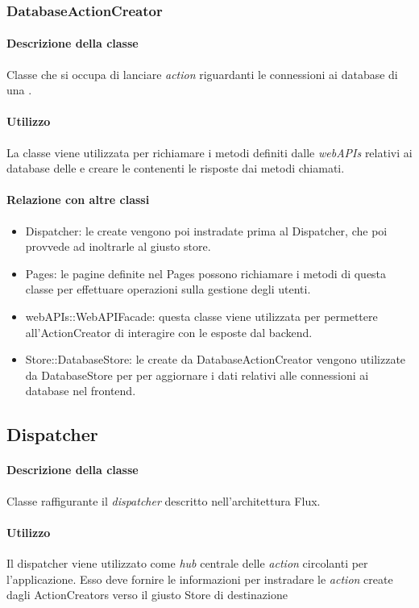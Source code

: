 \subsubsection{DatabaseActionCreator}
\paragraph*{Descrizione della classe}
Classe che si occupa di lanciare \textit{action} riguardanti le connessioni ai database di una .
\paragraph*{Utilizzo}
La classe viene utilizzata per richiamare i metodi definiti dalle \textit{webAPIs} relativi ai database delle  e creare le  contenenti le risposte dai metodi chiamati.
\paragraph*{Relazione con altre classi}
\begin{itemize}
\item Dispatcher: le  create vengono poi instradate prima al Dispatcher, che poi provvede ad inoltrarle al giusto store.
\item Pages: le pagine definite nel  Pages possono richiamare i metodi di questa classe per effettuare operazioni sulla gestione degli utenti.
\item webAPIs::WebAPIFacade: questa classe viene utilizzata per permettere all'ActionCreator di interagire con le  esposte dal backend.
\item Store::DatabaseStore: le  create da DatabaseActionCreator vengono utilizzate da DatabaseStore per per aggiornare i dati relativi alle connessioni ai database nel frontend.
\end{itemize}

\subsection{Dispatcher}
\paragraph*{Descrizione della classe}
Classe raffigurante il \textit{dispatcher} descritto nell'architettura Flux.
\paragraph*{Utilizzo}
Il dispatcher viene utilizzato come \textit{hub} centrale delle \textit{action} circolanti per l'applicazione. Esso deve fornire le informazioni per instradare le \textit{action} create dagli ActionCreators verso il giusto Store di destinazione
